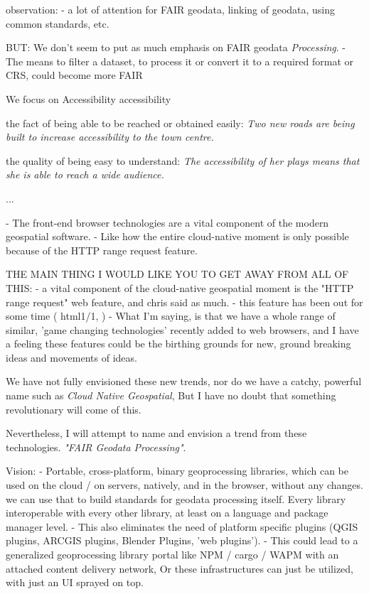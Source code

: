 observation: 
- a lot of attention for FAIR geodata, linking of geodata, using common standards, etc. 

BUT: We don't seem to put as much emphasis on FAIR geodata \emph{Processing}. 
- The means to filter a dataset, to process it or convert it to a required format or CRS, could become more FAIR

We focus on Accessibility
accessibility

\m{->} the fact of being able to be reached or obtained easily:
\textit{Two new roads are being built to increase accessibility to the town centre.}

\m{->} the quality of being easy to understand: 
\textit{The accessibility of her plays means that she is able to reach a wide audience.}

...

- The front-end browser technologies are a vital component of the modern geospatial software.
- Like how the entire cloud-native moment is only possible because of the HTTP range request feature. 


THE MAIN THING I WOULD LIKE YOU TO GET AWAY FROM ALL OF THIS:
- a vital component of the cloud-native geospatial moment is the "HTTP range request" web feature, and chris said as much.
  - this feature has been out for some time ( html1/1, )
- What I'm saying, is that we have a whole range of similar, 'game changing technologies' recently added to web browsers, and I have a feeling these features could be the birthing grounds for new, ground breaking ideas and movements of ideas. 

We have not fully envisioned these new trends, nor do we have a catchy, powerful name such as \emph{Cloud Native Geospatial}, But I have no doubt that something revolutionary will come of this. 

Nevertheless, I will attempt to name and envision a trend from these technologies. \emph{"FAIR Geodata Processing"}.

Vision: 
- Portable, cross-platform, binary geoprocessing libraries, which can be used on the cloud / on servers, natively, and in the browser, without any changes. 
\m{->} we can use that to build standards for geodata processing itself. Every  library interoperable with every other library, at least on a language and package manager level.
- This also eliminates the need of platform specific plugins (QGIS plugins, ARCGIS plugins, Blender Plugins, 'web plugins').
- This could lead to a generalized geoprocessing library portal like NPM / cargo / WAPM with an attached content delivery network, Or these infrastructures can just be utilized, with just an UI sprayed on top.

